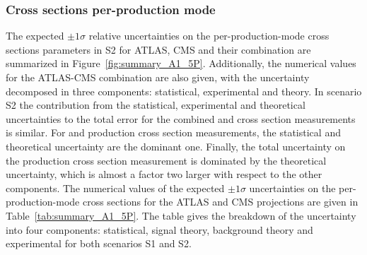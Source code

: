 








\subsubsection{Cross sections per-production mode}

The expected $\pm 1\sigma$ relative uncertainties on the per-production-mode cross sections parameters in S2 for ATLAS, CMS and their combination are summarized in Figure~\ref{fig:summary_A1_5P}.
Additionally, the numerical values for the ATLAS-CMS combination  are also given, with the uncertainty decomposed in three components: statistical, experimental and theory.
In scenario S2 the contribution from the statistical, experimental and theoretical uncertainties to the total error for the combined  \ggH and \vbf cross section measurements is similar. For \wh and \zh production cross section measurements, the statistical  and theoretical uncertainty are the dominant one.
Finally, the total uncertainty on the \tth production cross section measurement is dominated by the theoretical uncertainty, which is almost a factor two larger with respect to the other components.
The numerical values of the expected $\pm 1\sigma$ uncertainties on the per-production-mode cross sections for the ATLAS and CMS projections are given in Table~\ref{tab:summary_A1_5P}. The table  gives the breakdown of the uncertainty into four components: statistical, signal theory, background theory and experimental for both scenarios S1 and S2. 

